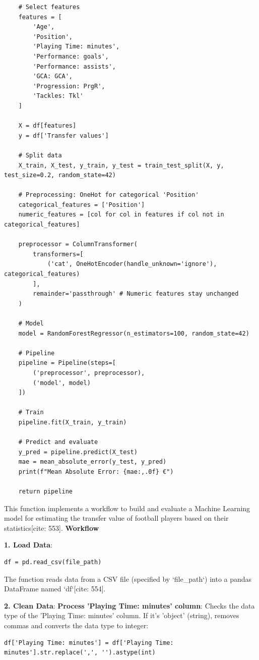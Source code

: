 \documentclass[12pt]{report}
\begin{document}
{{{\begin{lstlisting}
    # Select features
    features = [
        'Age',
        'Position',
        'Playing Time: minutes',
        'Performance: goals',
        'Performance: assists',
        'GCA: GCA',
        'Progression: PrgR',
        'Tackles: Tkl'
    ]

    X = df[features]
    y = df['Transfer values']

    # Split data
    X_train, X_test, y_train, y_test = train_test_split(X, y, test_size=0.2, random_state=42)

    # Preprocessing: OneHot for categorical 'Position'
    categorical_features = ['Position']
    numeric_features = [col for col in features if col not in categorical_features]

    preprocessor = ColumnTransformer(
        transformers=[
            ('cat', OneHotEncoder(handle_unknown='ignore'), categorical_features)
        ],
        remainder='passthrough' # Numeric features stay unchanged
    )

    # Model
    model = RandomForestRegressor(n_estimators=100, random_state=42)

    # Pipeline
    pipeline = Pipeline(steps=[
        ('preprocessor', preprocessor),
        ('model', model)
    ])

    # Train
    pipeline.fit(X_train, y_train)

    # Predict and evaluate
    y_pred = pipeline.predict(X_test)
    mae = mean_absolute_error(y_test, y_pred)
    print(f"Mean Absolute Error: {mae:,.0f} €")

    return pipeline
\end{lstlisting}
This function implements a workflow to build and evaluate a Machine Learning model for estimating the transfer value of football players based on their statistics[cite: 553].
\textbf{Workflow}

\textbf{1. Load Data}:
\begin{verbatim}
df = pd.read_csv(file_path)
\end{verbatim}
The function reads data from a CSV file (specified by `file_path`) into a pandas DataFrame named `df`[cite: 554].

\textbf{2. Clean Data}:
\textbf{Process 'Playing Time: minutes' column}:
Checks the data type of the 'Playing Time: minutes' column. If it's 'object' (string), removes commas and converts the data type to integer:
\begin{verbatim}
df['Playing Time: minutes'] = df['Playing Time: minutes'].str.replace(',', '').astype(int)
\end{verbatim}

}}}
\end{document}
